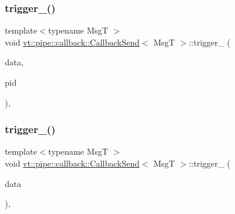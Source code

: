 \mbox{\label{structvt_1_1pipe_1_1callback_1_1_callback_send_ae86cee78a79a6a0f0823bcbbb94629d5}} 
\subsubsection{\texorpdfstring{trigger\+\_\+()}{trigger\_()}\hspace{0.1cm}{\footnotesize\ttfamily [1/2]}}
{\footnotesize\ttfamily template$<$typename MsgT $>$ \\
void \hyperlink{structvt_1_1pipe_1_1callback_1_1_callback_send}{vt\+::pipe\+::callback\+::\+Callback\+Send}$<$ MsgT $>$\+::trigger\+\_\+ (\begin{DoxyParamCaption}\item[{\hyperlink{structvt_1_1pipe_1_1callback_1_1_callback_send_a5b21820f25b28f980921b1fe24d8a2dc}{Signal\+Data\+Type} $\ast$}]{data,  }\item[{\hyperlink{namespacevt_ac9852acda74d1896f48f406cd72c7bd3}{Pipe\+Type} const \&}]{pid }\end{DoxyParamCaption})\hspace{0.3cm}{\ttfamily [override]}, {\ttfamily [private]}}

\mbox{\label{structvt_1_1pipe_1_1callback_1_1_callback_send_a262653b7b9260e5bcd3de0e4cafd9c9c}} 
\subsubsection{\texorpdfstring{trigger\+\_\+()}{trigger\_()}\hspace{0.1cm}{\footnotesize\ttfamily [2/2]}}
{\footnotesize\ttfamily template$<$typename MsgT $>$ \\
void \hyperlink{structvt_1_1pipe_1_1callback_1_1_callback_send}{vt\+::pipe\+::callback\+::\+Callback\+Send}$<$ MsgT $>$\+::trigger\+\_\+ (\begin{DoxyParamCaption}\item[{\hyperlink{structvt_1_1pipe_1_1callback_1_1_callback_send_a5b21820f25b28f980921b1fe24d8a2dc}{Signal\+Data\+Type} $\ast$}]{data }\end{DoxyParamCaption})\hspace{0.3cm}{\ttfamily [override]}, {\ttfamily [private]}}

